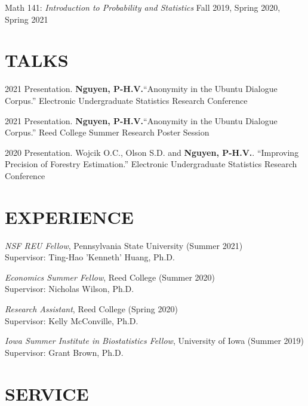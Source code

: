 \documentclass[margin]{res}
\def\pvn{\textbf{Nguyen, P-H.V.}}
\begin{document}
\begin{resume}
Math 141: {\it Introduction to Probability and Statistics} \hfill Fall 2019, Spring 2020, Spring 2021


\section{TALKS}

2021 Presentation. \pvn “Anonymity in the Ubuntu Dialogue Corpus.” Electronic Undergraduate Statistics Research Conference

2021 Presentation. \pvn “Anonymity in the Ubuntu Dialogue Corpus.” Reed College Summer Research Poster Session

2020 Presentation. Wojcik O.C., Olson S.D. and \pvn. “Improving Precision of Forestry Estimation.” Electronic Undergraduate Statistics Research Conference

\section{EXPERIENCE}

\emph{NSF REU Fellow}, Pennsylvania State University (Summer 2021) \\
Supervisor: Ting-Hao 'Kenneth' Huang, Ph.D.

\emph{Economics Summer Fellow}, Reed College (Summer 2020) \\
Supervisor: Nicholas Wilson, Ph.D.

\emph{Research Assistant}, Reed College (Spring 2020) \\
Supervisor: Kelly McConville, Ph.D.

\emph{Iowa Summer Institute in Biostatistics Fellow}, University of Iowa (Summer 2019) \\
Supervisor: Grant Brown, Ph.D.

\section{SERVICE}

\end{resume} 
\end{document}
